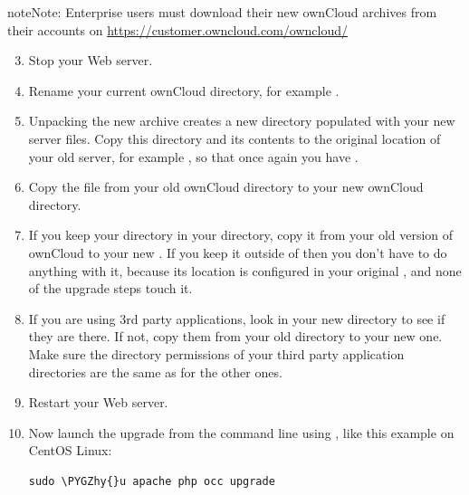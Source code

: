 \documentclass[letterpaper,10pt,english]{sphinxmanual}
\def\PYGZhy{\char`\-}
\begin{document}
\begin{notice}{note}{Note:}
Enterprise users must download their new ownCloud archives from
their accounts on \href{https://customer.owncloud.com/owncloud/}{https://customer.owncloud.com/owncloud/}
\end{notice}
\begin{enumerate}
\setcounter{enumi}{2}
\item {} 
Stop your Web server.

\item {} 
Rename your current ownCloud directory, for example .

\item {} 
Unpacking the new archive creates a new  directory populated
with your new server files. Copy this directory and its contents to the
original location of your old server, for example , so that
once again you have .

\item {} 
Copy the  file from your old ownCloud directory to your new
ownCloud directory.

\item {} 
If you keep your  directory in your  directory, copy
it from your old version of ownCloud to your new . If you keep
it outside of  then you don't have to do anything with it,
because its location is configured in your original , and
none of the upgrade steps touch it.

\item {} 
If you are using 3rd party applications, look in your new 
directory to see if they are there. If not, copy them from your old 
directory to your new one. Make sure the directory permissions of your third
party application directories are the same as for the other ones.

\item {} 
Restart your Web server.

\item {} 
Now launch the upgrade from the command  line using , like this
example on CentOS Linux:

\begin{Verbatim}[commandchars=\\\{\}]
sudo \PYGZhy{}u apache php occ upgrade
\end{Verbatim}

\end{enumerate}
\end{document}
